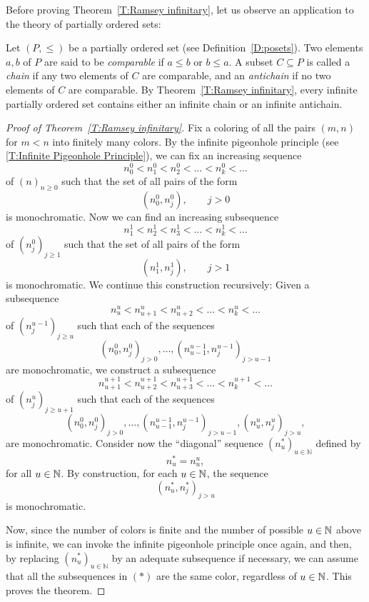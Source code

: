 Before proving Theorem~\ref{T:Ramsey infinitary}, let us observe an application to the theory of partially ordered sets:

\begin{example}
Let $(P,\le)$ be a partially ordered set (see Definition~\ref{D:posets}). 
Two elements $a, b$ of $P$ are said to be \emph{comparable} if $a\le b$ or $b\le a$. A subset $C\subseteq P$ is called a \emph{chain} if any two elements of $C$ are comparable, and an \emph{antichain} if no two elements of $C$ are comparable. By Theorem~\ref{T:Ramsey infinitary}, every infinite partially ordered set contains either an infinite chain or an infinite antichain.
\end{example}

\begin{proof}[Proof of Theorem~\ref{T:Ramsey infinitary}]
Fix a coloring of all the pairs $(m,n)$ for $m<n$ into finitely many colors.
By the infinite pigeonhole principle (see \ref{T:Infinite Pigeonhole Principle}), we can fix an increasing sequence
\[
n_0 ^0< n_1^0 < n_2^0<\dots < n_k^0<\dots
\]
of $(n)_{n\ge 0}$ such that the set of all pairs of the form
\[
(n_0 ^{0} ,n_j ^{0}),\qquad
j>0
\]
is monochromatic. Now we can find an increasing  subsequence
\[
 n_1^1< n_2^1<n_3^1<\dots < n_k^1<\dots
\]
of $(n_j ^{0})_{j\ge 1}$ such that the set of all pairs of the form
\[
(n_1 ^{1} ,n_j^1),\qquad
j>1
\]
is monochromatic. We continue this construction recursively: Given a subsequence
\[
 n_u^u < n_{u+1}^u<n_{u+2}^u<\dots <n_k^u<\dots
\]
of $(n_j ^{u-1})_{j\ge u}$ such that each of the sequences
\[
(n_0 ^{0} ,n_j ^{0})_{j>0},
\dots,
(n_{u-1}^{u-1} ,n_{j} ^{u-1})_{j>u-1}
\]
are monochromatic, we construct a subsequence
\[
 n_{u+1}^{u+1}< n_{u+2}^{u+1}<n_{u+3}^{u+1}<\dots < n_k^{u+1}<\dots
\]
of $(n_j ^{u})_{j\ge u+1}$ such that each of the sequences
\[
(n_0 ^{0} ,n_j ^{0})_{j>0},
\dots,
(n_{u-1}^{u-1} ,n_{j} ^{u-1})_{j>u-1},
(n_{u}^{u} ,n_{j} ^{u})_{j>u},
\]
are monochromatic.
Consider now the ``diagonal'' sequence $(n^*_u)_{u\in \mathbb{N}}$ defined by
\[
n^*_u=n_u^u,
\]
for all $u\in\mathbb{N}$. By construction, for each $u\in\mathbb{N}$, the sequence
\[
\tag{*}
(n^*_u, n^*_j)_{j>u}
\]
is monochromatic. 

Now, since the number of colors is finite and the number of possible $u\in\mathbb{N}$ above is infinite,  we can invoke the infinite pigeonhole principle once again, and then,  by replacing    $(n^*_u)_{u\in \mathbb{N}}$ by an adequate subsequence if necessary, we can assume that all the subsequences  in $(*)$ are the same color, regardless of $u\in\mathbb{N}$. This proves the theorem.
\end{proof}

